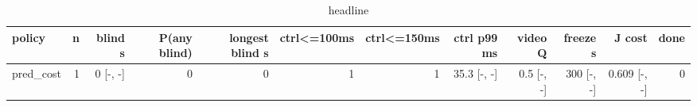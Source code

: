 \begin{table}[t]\centering\small
\begin{tabular}{lrrrrrrrrrrr}\toprule
policy & n & blind s & P(any blind) & longest blind s & ctrl<=100ms & ctrl<=150ms & ctrl p99 ms & video Q & freeze s & J cost & done \\\midrule
pred\_cost & 1 & 0 [-, -] & 0 & 0 & 1 & 1 & 35.3 [-, -] & 0.5 [-, -] & 300 [-, -] & 0.609 [-, -] & 0 \\
\bottomrule\end{tabular}\caption{headline}\end{table}
